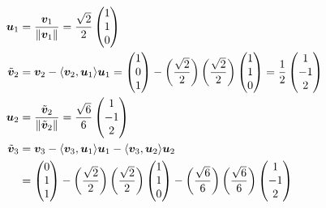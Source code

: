 \begin{example}
    \begin{align*}
        \bm u_1 &= \frac{\bm v_1}{\lVert\bm v_1\rVert} = \frac{\sqrt{2}}{2}
        \begin{pmatrix}
            1 \\ 1 \\ 0
        \end{pmatrix}
        \\
        \tilde{\bm v}_2 &= \bm v_2 - \langle \bm v_2, \bm u_1 \rangle \bm u_1 = 
        \begin{pmatrix}
            1 \\ 0 \\ 1
        \end{pmatrix}
        - \left( \frac{\sqrt{2}}{2} \right) \left( \frac{\sqrt 2}{2} \right)
        \begin{pmatrix}
            1 \\ 1 \\ 0
        \end{pmatrix} 
        = \frac 1 2
        \begin{pmatrix}
            1 \\ -1 \\ 2
        \end{pmatrix} 
        \\
        \bm u_2 &= \frac{\tilde{\bm v}_2}{\lVert\tilde{\bm v}_2\rVert} = \frac{\sqrt{6}}{6}
        \begin{pmatrix}
            1 \\ -1 \\ 2
        \end{pmatrix} 
        \\
        \tilde{\bm v}_3 &= \bm v_3 - \langle \bm v_3, \bm u_1 \rangle \bm u_1 - \langle \bm v_3, \bm u_2 \rangle \bm u_2 \\
        &= 
        \begin{pmatrix}
            0 \\ 1 \\ 1
        \end{pmatrix}
        - \left( \frac{\sqrt 2}{2} \right) \left( \frac{\sqrt 2} 2 \right)
        \begin{pmatrix}
            1 \\ 1 \\ 0
        \end{pmatrix}
        - \left( \frac{\sqrt 6} 6 \right) \left( \frac{\sqrt 6}{6} \right)
        \begin{pmatrix}
            1 \\ -1 \\ 2

\end{pmatrix}
\end{align*}
\end{example}
